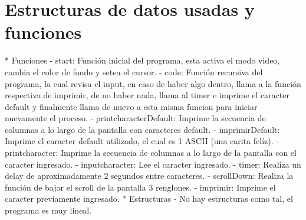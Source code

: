\documentclass{report}
\begin{document}
\section{Estructuras de datos usadas y funciones}
* Funciones \newline
\newline
- start: \newline
Funci\'on inicial del programa, esta activa el modo video, cambia el color de fondo y setea el cursor. \newline
\newline
- code: \newline
Funci\'on recursiva del programa, la cual revisa el input, en caso de haber algo dentro, llama a la funci\'on respectiva de imprimir, de no haber nada, llama al timer e imprime el caracter default y finalmente llama de nuevo a esta misma funcion para iniciar nuevamente el proceso. \newline
\newline
- printcharacterDefault: \newline
Imprime la secuencia de columnas a lo largo de la pantalla con caracteres default. \newline
\newline
- imprimirDefault: \newline
Imprime el caracter default utilizado, el cual es 1 ASCII (una carita fel\'iz). \newline
\newline
- printcharacter: \newline
Imprime la secuencia de columnas a lo largo de la pantalla con el caracter ingresado. \newline
\newline
- inputcharacter: \newline
Lee el caracter ingresado. \newline
\newline
- timer: \newline
Realiza un delay de aproximadamente 2 segundos entre caracteres. \newline
\newline
- scrollDown: \newline
Realiza la funci\'on de bajar el scroll de la pantalla 3 renglones. \newline
\newline
- imprimir: \newline
Imprime el caracter previamente ingresado. \newline
\newline
\newline
* Estructuras \newline
\newline
- No hay estructuras como tal, el programa es muy lineal. \newline
\end{document}
